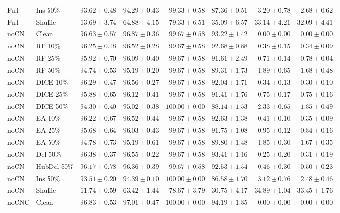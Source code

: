 {\begin{longtable}{llrrrrrr}
Full & Ins 50\% & $93.62\pm0.48$ & $94.29\pm0.43$ & $99.33\pm0.58$ & $87.36\pm0.51$ & $3.20\pm0.78$ & $2.68\pm0.62$ \\
Full & Shuffle & $63.69\pm3.74$ & $64.88\pm4.15$ & $79.33\pm6.51$ & $35.09\pm6.57$ & $33.14\pm4.21$ & $32.09\pm4.41$ \\
noCN & Clean & $96.63\pm0.57$ & $96.87\pm0.36$ & $99.67\pm0.58$ & $93.22\pm1.42$ & $0.00\pm0.00$ & $0.00\pm0.00$ \\
noCN & RF 10\% & $96.25\pm0.48$ & $96.52\pm0.28$ & $99.67\pm0.58$ & $92.68\pm0.88$ & $0.38\pm0.15$ & $0.34\pm0.09$ \\
noCN & RF 25\% & $95.92\pm0.70$ & $96.09\pm0.40$ & $99.67\pm0.58$ & $91.61\pm2.49$ & $0.71\pm0.14$ & $0.78\pm0.04$ \\
noCN & RF 50\% & $94.74\pm0.53$ & $95.19\pm0.20$ & $99.67\pm0.58$ & $89.31\pm1.73$ & $1.89\pm0.65$ & $1.68\pm0.48$ \\
noCN & DICE 10\% & $96.29\pm0.47$ & $96.56\pm0.27$ & $99.67\pm0.58$ & $92.04\pm1.71$ & $0.34\pm0.13$ & $0.30\pm0.10$ \\
noCN & DICE 25\% & $95.88\pm0.65$ & $96.12\pm0.41$ & $99.67\pm0.58$ & $91.41\pm1.76$ & $0.75\pm0.17$ & $0.75\pm0.16$ \\
noCN & DICE 50\% & $94.30\pm0.40$ & $95.02\pm0.38$ & $100.00\pm0.00$ & $88.14\pm1.53$ & $2.33\pm0.65$ & $1.85\pm0.49$ \\
noCN & EA 10\% & $96.22\pm0.67$ & $96.52\pm0.44$ & $99.67\pm0.58$ & $92.63\pm1.38$ & $0.41\pm0.10$ & $0.35\pm0.09$ \\
noCN & EA 25\% & $95.68\pm0.64$ & $96.03\pm0.43$ & $99.67\pm0.58$ & $91.75\pm1.08$ & $0.95\pm0.12$ & $0.84\pm0.16$ \\
noCN & EA 50\% & $94.78\pm0.73$ & $95.19\pm0.61$ & $99.67\pm0.58$ & $89.80\pm1.48$ & $1.85\pm0.30$ & $1.67\pm0.35$ \\
noCN & Del 50\% & $96.38\pm0.37$ & $96.55\pm0.22$ & $99.67\pm0.58$ & $93.41\pm1.16$ & $0.25\pm0.20$ & $0.31\pm0.19$ \\
noCN & HubDel 50\% & $96.17\pm0.78$ & $96.36\pm0.39$ & $99.67\pm0.58$ & $92.53\pm1.54$ & $0.46\pm0.30$ & $0.50\pm0.23$ \\
noCN & Ins 50\% & $93.51\pm0.20$ & $94.39\pm0.10$ & $100.00\pm0.00$ & $86.58\pm1.70$ & $3.12\pm0.76$ & $2.48\pm0.46$ \\
noCN & Shuffle & $61.74\pm0.59$ & $63.42\pm1.44$ & $78.67\pm3.79$ & $30.75\pm4.17$ & $34.89\pm1.04$ & $33.45\pm1.76$ \\
noCNC & Clean & $96.83\pm0.53$ & $97.01\pm0.47$ & $100.00\pm0.00$ & $94.19\pm1.85$ & $0.00\pm0.00$ & $0.00\pm0.00$ \\

\end{longtable}}
